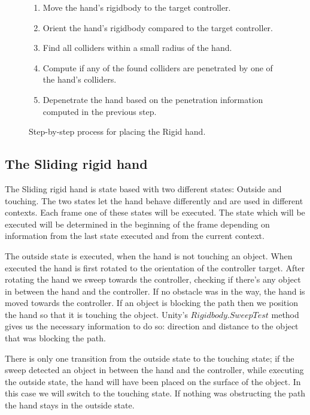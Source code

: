 \begin{figure}[H]
\centering
\small
\begin{enumerate}[noitemsep]
\item Move the hand's rigidbody to the target controller.
\item Orient the hand's rigidbody compared to the target controller.
\item Find all colliders within a small radius of the hand.
\item Compute if any of the found colliders are penetrated by one of the hand's colliders.
\item Depenetrate the hand based on the penetration information computed in the previous step.
\end{enumerate}
\caption{Step-by-step process for placing the Rigid hand.}
\label{fig:stepByStepRigidHand}
\end{figure}


\subsection{The Sliding rigid hand}
\label{subsec:slidingRigidHand}
The Sliding rigid hand is state based with two different states: Outside and touching. The two states let the hand behave differently and are used in different contexts. Each frame one of these states will be executed. The state which will be executed will be determined in the beginning of the frame depending on information from the last state executed and from the current context.

The outside state is executed, when the hand is not touching an object. When executed the hand is first rotated to the orientation of the controller target. After rotating the hand we sweep towards the controller, checking if there's any object in between the hand and the controller. If no obstacle was in the way, the hand is moved towards the controller. If an object is blocking the path then we position the hand so that it is touching the object. Unity's $Rigidbody.SweepTest$ method gives us the necessary information to do so: direction and distance to the object that was blocking the path.

There is only one transition from the outside state to the touching state; if the sweep detected an object in between the hand and the controller, while executing the outside state, the hand will have been placed on the surface of the object. In this case we will switch to the touching state. If nothing was obstructing the path the hand stays in the outside state.

